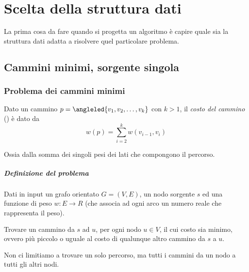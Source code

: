 
\ifsubfile
\usepackage{../settings/subfile}
\setcounter{chapter}{13}


\fi
\chapter{Scelta della struttura dati}

\begin{note}
La prima cosa da fare quando si progetta un algoritmo è capire quale sia la struttura dati adatta a risolvere quel particolare problema.
\end{note}

\section{Cammini minimi, sorgente singola}

\subsection{Problema dei cammini minimi}

\begin{definition}
Dato un cammino \(p = \angleled{v_1, v_2, \ldots, v_k}\) con \(k > 1\), il \emph{costo del cammino} () è dato da
\begin{equation*}
w(p) = \sum_{i=2}^k w(v_{i-1}, v_i)
\end{equation*}
\end{definition}
Ossia dalla somma dei singoli pesi dei lati che compongono il percorso.

\paragraph{Definizione del problema}
Dati in input un grafo orientato \(G = (V, E)\), un nodo sorgente \(s\) ed una funzione di peso \(w \colon E \to R\) (che associa ad ogni arco un numero reale che rappresenta il peso).

Trovare un cammino da \(s\) ad \(u\), per ogni nodo \(u \in V\), il cui costo sia minimo, ovvero più piccolo o uguale al costo di qualunque altro cammino da \(s\) a \(u\).

\begin{note}
Non ci limitiamo a trovare un solo percorso, ma tutti i cammini da un nodo a tutti gli altri nodi.
\end{note}

